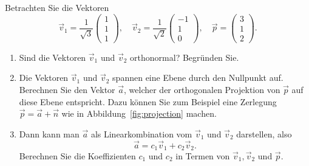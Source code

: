 \begin{aufgabe} \label{aufg:projection_3d}
	Betrachten Sie die Vektoren
	\begin{equation*}
		\vec v_1=\frac{1}{\sqrt{3}}\begin{pmatrix}
			1 \\ 1 \\ 1
		\end{pmatrix},\quad
		\vec v_2=\frac{1}{\sqrt{2}}\begin{pmatrix}
			-1 \\ 1 \\  0
		\end{pmatrix},\quad
		\vec p=\begin{pmatrix}
			3 \\ 1 \\  2
		\end{pmatrix}.
	\end{equation*}
	\begin{enumerate}[label=(\alph*)]
		\item Sind die Vektoren $\vec v_1$ und $\vec v_2$ orthonormal? Begründen Sie.
		\item Die Vektoren $\vec v_1$ und $\vec v_2$ spannen eine Ebene durch den Nullpunkt auf.
		Berechnen Sie den Vektor $\vec a$, welcher der orthogonalen Projektion von $\vec p$ auf diese Ebene entspricht.
		Dazu können Sie zum Beispiel eine Zerlegung $\vec p=\vec a+\vec n$ wie in Abbildung~\ref{fig:projection} machen.
		\item Dann kann man $\vec a$ als Linearkombination vom $\vec v_1$ und $\vec v_2$ darstellen, also
		\begin{equation*}
			\vec a=c_1\vec v_1+c_2\vec v_2.
		\end{equation*}
		Berechnen Sie die Koeffizienten $c_1$ und $c_2$ in Termen von $\vec v_1,\vec v_2$ und $\vec p$.
	\end{enumerate}
\end{aufgabe}
